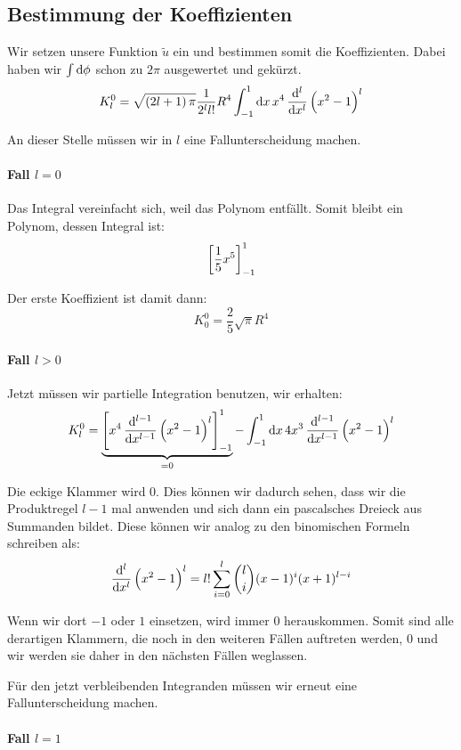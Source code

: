 \documentclass[11pt, ngerman, fleqn]{article}
\begin{document}
\subsection{Bestimmung der Koeffizienten}

Wir setzen unsere Funktion $\tilde u$ ein und bestimmen somit die
Koeffizienten. Dabei haben wir $\int \dif \phi$ schon zu $2 \pi$ ausgewertet
und gekürzt.
\[
K_l^0 = \sqrt{\del{2l+1} \pi} \frac{1}{2^l l!} R^4 \int_{-1}^1 \dif x \, x^4 \dod[l]{}x \del{x^2-1}^l
\]

An dieser Stelle müssen wir in $l$ eine Fallunterscheidung machen.

\paragraph{Fall $l = 0$}

Das Integral vereinfacht sich, weil das Polynom entfällt. Somit bleibt ein
Polynom, dessen Integral ist:
\[
\sbr{\frac 15 x^5}_{-1}^1
\]

Der erste Koeffizient ist damit dann:
\[
K_0^0 = \frac 25 \sqrt{\pi} R^4
\]

\paragraph{Fall $l > 0$}

Jetzt müssen wir partielle Integration benutzen, wir erhalten:
\[
K_l^0 = \underbrace{\sbr{x^4 \dod[l-1]{}x \del{x^2-1}^l}_{-1}^1}_{=0} - \int_{-1}^1 \dif x \, 4 x^3 \dod[l-1]{}x \del{x^2-1}^l
\]

Die eckige Klammer wird $0$. Dies können wir dadurch sehen, dass wir die
Produktregel $l-1$ mal anwenden und sich dann ein pascalsches Dreieck aus
Summanden bildet. Diese können wir analog zu den binomischen Formeln schreiben
als:
\begin{equation}
	\label{eq:leibniz}
	\dod[l]{}x \del{x^2-1}^l = l! \sum_{i=0}^l \binom{l}{i} (x-1)^i (x+1)^{l-i}
\end{equation}

Wenn wir dort $-1$ oder $1$ einsetzen, wird immer $0$ herauskommen. Somit sind
alle derartigen Klammern, die noch in den weiteren Fällen auftreten werden, 0
und wir werden sie daher in den nächsten Fällen weglassen.

Für den jetzt verbleibenden Integranden müssen wir erneut eine
Fallunterscheidung machen.

\paragraph{Fall $l = 1$}
\end{document}
